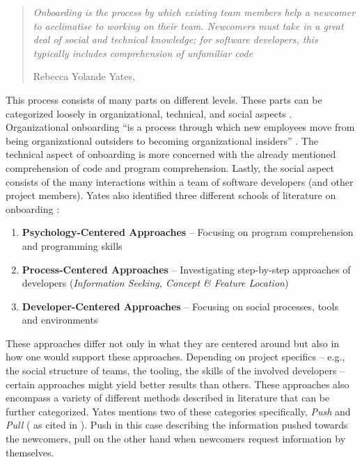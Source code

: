 \begin{quote}
  \textit{Onboarding is the process by which existing team members help a newcomer to acclimatise to working on their team. Newcomers must take in a great deal of social and technical knowledge; for software developers, this typically includes comprehension of unfamiliar code}

  \footnotesize{Rebecca Yolande Yates, \cite[p. 33]{yates2014onboarding}}
\end{quote}

This process consists of many parts on different levels. These parts can be categorized loosely in organizational, technical, and social aspects \cite[p. 33-35]{yates2014onboarding}. Organizational onboarding \enquote{is a process through which new employees move from being organizational outsiders to becoming organizational insiders} \cite{bauer2011organizational}. The technical aspect of onboarding is more concerned with the already mentioned comprehension of code and program comprehension. Lastly, the social aspect consists of the many interactions within a team of software developers (and other project members). Yates also identified three different schools of literature on onboarding \cite[p. 39-40]{yates2014onboarding}:

\begin{enumerate}
  \item{\textbf{Psychology-Centered Approaches} -- Focusing on program comprehension and programming skills}
  \item{\textbf{Process-Centered Approaches} -- Investigating step-by-step approaches of developers (\textit{Information Seeking, Concept \& Feature Location})}
  \item{\textbf{Developer-Centered Approaches} -- Focusing on social processes, tools and environments}
\end{enumerate}

These approaches differ not only in what they are centered around but also in how one would support these approaches. Depending on project specifics -- e.g., the social structure of teams, the tooling, the skills of the involved developers -- certain approaches might yield better results than others. These approaches also encompass a variety of different methods described in literature that can be further categorized. Yates mentions two of these categories specifically, \textit{Push} and \textit{Pull} (\cite{cybenko1999foundations} as cited in \cite[p. 29]{yates2014onboarding}). Push in this case describing the information pushed towards the newcomers, pull on the other hand when newcomers request information by themselves.

